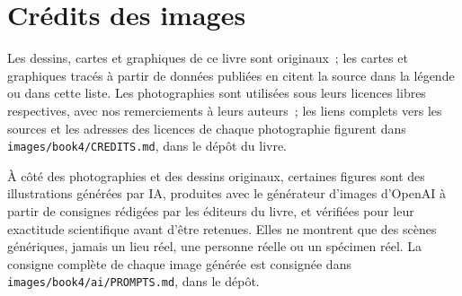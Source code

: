 \chapter*{Crédits des images}

Les dessins, cartes et graphiques de ce livre sont originaux~; les cartes
et graphiques tracés à partir de données publiées en citent la source dans
la légende ou dans cette liste. Les photographies sont utilisées sous leurs
licences libres respectives, avec nos remerciements à leurs auteurs~; les
liens complets vers les sources et les adresses des licences de chaque
photographie figurent dans \texttt{images/book4/CREDITS.md}, dans le dépôt
du livre.

\bigskip
À côté des photographies et des dessins originaux, certaines figures sont
des illustrations générées par IA, produites avec le générateur d'images
d'OpenAI à partir de consignes rédigées par les éditeurs du livre, et
vérifiées pour leur exactitude scientifique avant d'être retenues. Elles
ne montrent que des scènes génériques, jamais un lieu réel, une personne
réelle ou un spécimen réel. La consigne complète de chaque image générée
est consignée dans \texttt{images/book4/ai/PROMPTS.md}, dans le dépôt.

